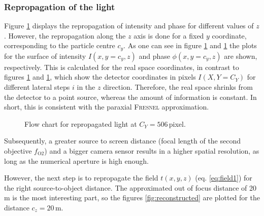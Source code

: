 \documentclass{article}
\begin{document}
\subsubsection{Repropagation of the light}
Figure \ref{fig:flowchart} displays the repropagation of intensity and phase for different values of $z$. However, the repropagation along the $z$ axis is done for a fixed $y$ coordinate, corresponding to the particle centre $c_y$. As one can see in figure \ref{fig:flowchart} and \ref{fig:flowchart} the plots for the surface of intensity $I(x,y=c_y,z)$ and phase $\phi(x,y=c_y,z)$ are shown, respectively. This is calculated for the real space coordinates, in contrast to figures \ref{fig:flowchart} and \ref{fig:flowchart}, which show the detector coordinates in pixels $I(X,Y=C_Y)$ for different lateral steps $i$ in the $z$ direction. Therefore, the real space shrinks from the detector to a point source, whereas the amount of information is constant. In short, this is consistent with the paraxial \textsc{Fresnel} approximation.
\begin{figure}[ht]
    \centering
    \caption{Flow chart for repropagated light at $C_Y=506\,$pixel.}
    \label{fig:flowchart}
\end{figure}
Subsequently, a greater source to screen distance (focal length of the second objective $f_\text{O2}$) and a bigger camera sensor results in a higher spatial resolution, as long as the numerical aperture is high enough.

However, the next step is to repropagate the field $t(x,y,z)$ (eq.\,\,\ref{eq:field1}) for the right source-to-object distance. The approximated out of focus distance of 20\,\textmu m is the most interesting part, so the figures \ref{fig:reconstructed} are plotted for the distance $c_z=20$\,\textmu m.
\end{document}
